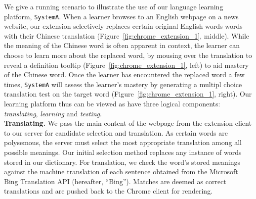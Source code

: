 \begin{CJK}{UTF8}{gbsn}
We give a running scenario to illustrate the use of our language
learning platform, {\tt SystemA}.  When a learner browses to an
English webpage on a news website, our extension selectively replaces
certain original English words words with their Chinese translation
(Figure~\ref{fig:chrome_extension_1}, middle).  While the meaning of
the Chinese word is often apparent in context, the learner can choose
to learn more about the replaced word, by mousing over the translation
to reveal a definition tooltip (Figure~\ref{fig:chrome_extension_1},
left) to aid mastery of the Chinese word.  Once the learner has
encountered the replaced word a few times, {\tt SystemA} will assess
the learner's mastery by generating a multipl choice translation test
on the target word (Figure~\ref{fig:chrome_extension_1}, right).  Our
learning platform thus can be viewed as have three logical components:
{\it translating}, {\it learning} and {\it testing}. \\

{\bf Translating.}  We pass the main content of the webpage from the
extension client to our server for candidate selection and
translation.  As certain words are polysemous, the server must select
the most appropriate translation among all possible meanings.  Our
initial selection method replaces any instance of words stored in our
dictionary.  For translation, we check the word's stored meanings
against the machine translation of each sentence obtained from the
Microsoft Bing Translation API (hereafter, ``Bing'').  Matches are
deemed as correct translations and are pushed back to the Chrome
client for rendering.



\end{CJK}
